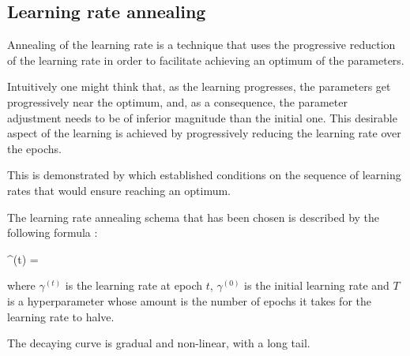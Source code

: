 \subsection{Learning rate annealing}

Annealing of the learning rate is a technique that uses the progressive reduction
of the learning rate in order to facilitate achieving an optimum of the parameters.

Intuitively one might think that, as the learning progresses, the parameters 
get progressively near the optimum, and, as a consequence, 
the parameter adjustment needs to be of inferior magnitude than the initial one.
This desirable aspect of the learning is achieved by progressively reducing the
learning rate over the epochs.

This is demonstrated by \cite{robbins} which established conditions on
the sequence of learning rates that would ensure reaching an optimum.

The learning rate annealing schema that has been chosen is described by the following
formula \cite{annealing}:

\begin{nalign}
\gamma^{(t)} = 
\end{nalign}

where $\gamma^{(t)}$ is the learning rate at epoch $t$,
$\gamma^{(0)}$ is the initial learning rate
and $T$ is a hyperparameter whose amount
is the number of epochs it takes for the learning rate
to halve.

The decaying curve is gradual and non-linear, with a long tail.
